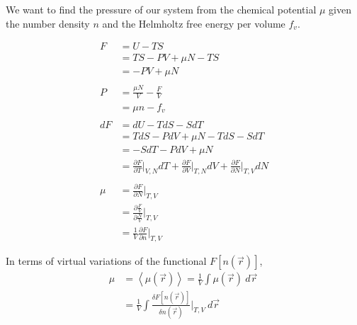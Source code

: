\documentclass[double,12pt]{beavtex}
\begin{document}
We want to find the pressure of our system from the chemical potential 
$\mu$ given the number density $n$ and the Helmholtz free energy per 
volume $f_v$. 

\begin{align}
	F &= U - TS  \\
	  &= TS -PV + \mu N - TS  \\
	  &= -PV + \mu N  \\ \nonumber\\
%
	P &= \frac{\mu N}{V} - \frac{F}{V} \\
	  &= \mu n - f_v   \\ \nonumber\\
%
	dF &= dU - TdS -SdT \\
	   &= TdS - PdV + \mu N  - TdS -SdT\\
	   &=  -SdT - PdV + \mu N \\
	   &= \frac{\partial F}{\partial T}\bigg|_{V,N}dT 
	       + \frac{\partial F}{\partial V}\bigg|_{T,N}dV 
	       + \frac{\partial F}{\partial N}\bigg|_{T,V}dN \\ \nonumber\\
%
    \mu &= \frac{\partial F}{\partial N}\bigg|_{T,V} \\
        &= \frac{\partial \frac{F}{V}}{\partial \frac{N}{V}}\bigg|_{T,V}\\
        &= \frac{1}{V}\frac{\partial F}{\partial n}\bigg|_{T,V}        
\end{align}

In terms of virtual variations of the functional $F[n(\vec r)]$, 
\begin{align}
    \mu &= \left<\mu(\vec r)\right> = \frac{1}{V} \int \mu(\vec r)~d\vec r~    \\
        &= \frac{1}{V} \int \frac{\delta F[n(\vec r)]}{\delta n(\vec r)}
           \bigg|_{T,V}~d\vec r~  
\end{align}
\end{document}
